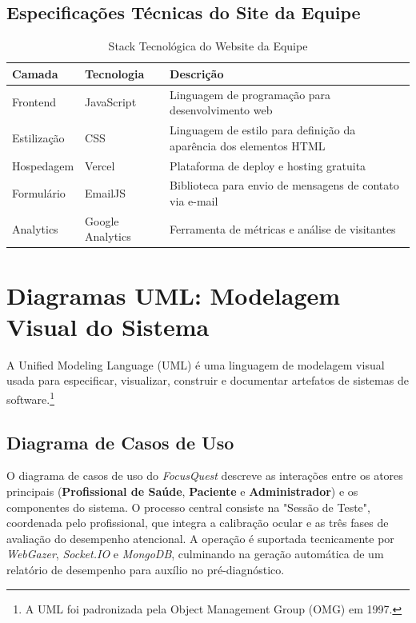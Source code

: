 \documentclass[11pt,a4paper]{article}
\begin{document}
\subsection{Especificações Técnicas do Site da Equipe}

\begin{table}[H]
\centering
\caption{Stack Tecnológica do Website da Equipe}
\label{tab:stack-web}
\begin{tabular}{|l|l|p{6cm}|}
\hline
\textbf{Camada} & \textbf{Tecnologia} & \textbf{Descrição} \\
\hline
Frontend & JavaScript & Linguagem de programação para desenvolvimento web \\
Estilização & CSS & Linguagem de estilo para definição da aparência dos elementos HTML \\
Hospedagem & Vercel & Plataforma de deploy e hosting gratuita \\
Formulário & EmailJS & Biblioteca para envio de mensagens de contato via e-mail \\
Analytics & Google Analytics & Ferramenta de métricas e análise de visitantes \\
\hline
\end{tabular}
\end{table}

\section{Diagramas UML: Modelagem Visual do Sistema}

A Unified Modeling Language (UML) \cite{kumar2024} é uma linguagem de modelagem visual usada para especificar, visualizar, construir e documentar artefatos de sistemas de software.\footnote{A UML foi padronizada pela Object Management Group (OMG) em 1997.}

\subsection{Diagrama de Casos de Uso}

O diagrama de casos de uso do \textit{FocusQuest} descreve as interações entre os atores principais (\textbf{Profissional de Saúde}, \textbf{Paciente} e \textbf{Administrador}) e os componentes do sistema. O processo central consiste na "Sessão de Teste", coordenada pelo profissional, que integra a calibração ocular e as três fases de avaliação do desempenho atencional. A operação é suportada tecnicamente por \textit{WebGazer}, \textit{Socket.IO} e \textit{MongoDB}, culminando na geração automática de um relatório de desempenho para auxílio no pré-diagnóstico.
\end{document}
